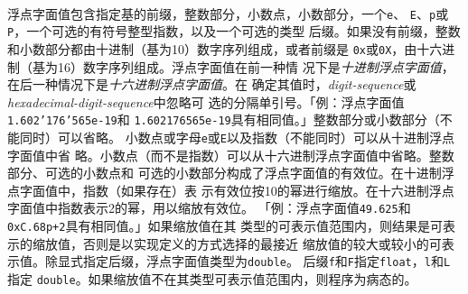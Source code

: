 \paragraph{}
浮点字面值包含指定基的前缀，整数部分，小数点，小数部分，一个\texttt{e}、
\texttt{E}、\texttt{p}或\texttt{P}，一个可选的有符号整型指数，以及一个可选的类型
后缀。如果没有前缀，整数和小数部分都由十进制（基为10）数字序列组成，或者前缀是
\texttt{0x}或\texttt{0X}，由十六进制（基为16）数字序列组成。浮点字面值在前一种情
况下是\textit{十进制浮点字面值}，在后一种情况下是\textit{十六进制浮点字面值}。在
确定其值时，\textit{digit-sequence}或\textit{hexadecimal-digit-sequence}中忽略可
选的分隔单引号。「例：浮点字面值\texttt{1.602'176'565e-19}和
\texttt{1.602176565e-19}具有相同值。」整数部分或小数部分（不能同时）可以省略。
小数点或字母\texttt{e}或\texttt{E}以及指数（不能同时）可以从十进制浮点字面值中省
略。小数点（而不是指数）可以从十六进制浮点字面值中省略。整数部分、可选的小数点和
可选的小数部分构成了浮点字面值的有效位。在十进制浮点字面值中，指数（如果存在）表
示有效位按10的幂进行缩放。在十六进制浮点字面值中指数表示2的幂，用以缩放有效位。
「例：浮点字面值\texttt{49.625}和\texttt{0xC.68p+2}具有相同值。」如果缩放值在其
类型的可表示值范围内，则结果是可表示的缩放值，否则是以实现定义的方式选择的最接近
缩放值的较大或较小的可表示值。除显式指定后缀，浮点字面值类型为\texttt{double}。
后缀\texttt{f}和\texttt{F}指定\texttt{float}，\texttt{l}和\texttt{L}指定
\texttt{double}。如果缩放值不在其类型可表示值范围内，则程序为病态的。


